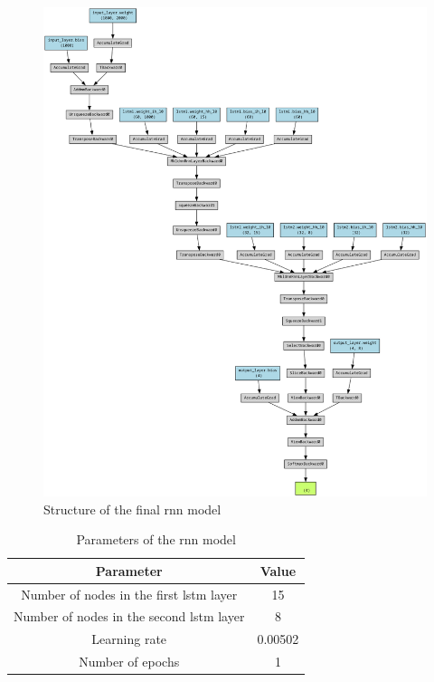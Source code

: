 \begin{figure}
    \centering
    \includegraphics[scale=0.25]{images/rnn_struct.png}
    \caption{Structure of the final \acrshort{rnn} model}
    \label{fig:rnn_struct}
\end{figure}

\begin{table}[]
    \centering
    \begin{tabular}{|c|c|}
    \hline
    \textbf{Parameter} & \textbf{Value} \\ \hline
    Number of nodes in the first \acrshort{lstm} layer & 15 \\ \hline
    Number of nodes in the second \acrshort{lstm} layer & 8 \\ \hline
    Learning rate & 0.00502 \\ \hline
    Number of epochs & 1 \\ \hline
    \end{tabular}
    \caption{Parameters of the \acrshort{rnn} model}
    \label{table:rnn_params}
\end{table}

